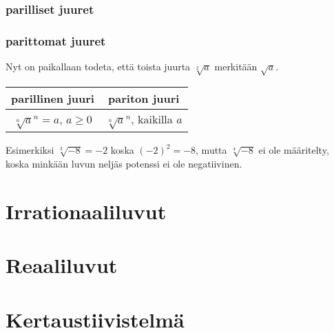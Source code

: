 \subsection{parilliset juuret}


\subsection{parittomat juuret}

Nyt on paikallaan todeta, että toista juurta $\sqrt[2]{a}$ merkitään $\sqrt{a}$.

\begin{tabular}{c|c}
parillinen juuri & pariton juuri\\
\hline
$\sqrt[n]{a}^n=a$, $a\ge0$ & $\sqrt[n]{a}^n$, kaikilla $a$
\end{tabular}

Esimerkiksi $\sqrt[3]{-8}=-2$ koska $(-2)^2=-8$, mutta $\sqrt[4]{-8}$ ei ole määritelty, koska minkään luvun neljäs potenssi ei ole negatiivinen.

%


\chapter{Irrationaaliluvut}
\chapter{Reaaliluvut}
\chapter{Kertaustiivistelmä}
